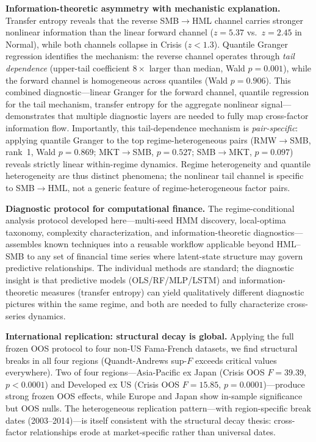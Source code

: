 \documentclass[sigconf,anonymous]{acmart}
\begin{document}
\textbf{Information-theoretic asymmetry with mechanistic explanation.}
Transfer entropy reveals that the reverse SMB$\to$HML channel carries
stronger nonlinear information than the linear forward channel
($z = 5.37$ vs.\ $z = 2.45$ in Normal), while both channels collapse
in Crisis ($z < 1.3$). Quantile Granger regression identifies the
mechanism: the reverse channel operates through \emph{tail dependence}
(upper-tail coefficient $8\times$ larger than median, Wald $p = 0.001$),
while the forward channel is homogeneous across quantiles (Wald $p = 0.906$).
This combined diagnostic---linear Granger for the forward channel,
quantile regression for the tail mechanism, transfer entropy for the
aggregate nonlinear signal---demonstrates that multiple diagnostic layers
are needed to fully map cross-factor information flow.
Importantly, this tail-dependence mechanism is \emph{pair-specific}:
applying quantile Granger to the top regime-heterogeneous pairs
(RMW$\to$SMB, rank~1, Wald $p = 0.869$; MKT$\to$SMB, $p = 0.527$;
SMB$\to$MKT, $p = 0.097$) reveals strictly linear within-regime dynamics.
Regime heterogeneity and quantile heterogeneity are thus distinct phenomena;
the nonlinear tail channel is specific to SMB$\to$HML, not a generic
feature of regime-heterogeneous factor pairs.

\textbf{Diagnostic protocol for computational finance.}
The regime-conditional analysis protocol developed here---multi-seed
HMM discovery, local-optima taxonomy, complexity characterization,
and information-theoretic diagnostics---assembles known techniques
into a reusable workflow applicable beyond HML--SMB to any set of
financial time series where latent-state structure may govern
predictive relationships. The individual methods are standard;
the diagnostic insight is that predictive models (OLS/RF/MLP/LSTM) and
information-theoretic measures (transfer entropy) can yield
qualitatively different diagnostic pictures within the same regime,
and both are needed to fully characterize cross-series dynamics.

\textbf{International replication: structural decay is global.}
Applying the full frozen OOS protocol to four non-US Fama-French datasets,
we find structural breaks in all four regions (Quandt-Andrews sup-$F$ exceeds
critical values everywhere). Two of four regions---Asia-Pacific ex Japan
(Crisis OOS $F = 39.39$, $p < 0.0001$) and Developed ex US
(Crisis OOS $F = 15.85$, $p = 0.0001$)---produce strong frozen OOS effects,
while Europe and Japan show in-sample significance but OOS nulls.
The heterogeneous replication pattern---with region-specific break dates
(2003--2014)---is itself consistent with the structural decay thesis:
cross-factor relationships erode at market-specific rather than universal dates.
\end{document}
